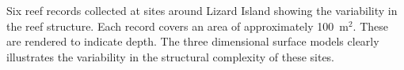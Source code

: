 \label{fig:reef_record_example_bathy}Six reef records collected at sites around Lizard Island showing the variability in the reef structure.  Each record covers an area of approximately 100~m$^2$.  These are rendered to indicate depth. The three dimensional surface models clearly illustrates the variability in the structural complexity of these sites.